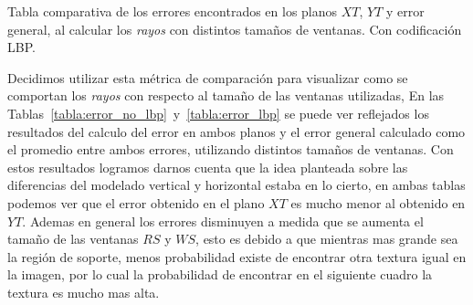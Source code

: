 \begin{table}[tb]
	\centering
	\caption{Tabla comparativa de los errores encontrados en los planos $XT$, $YT$ y error general, al calcular los \textit{rayos} con distintos tamaños de ventanas. Con codificación LBP.}
	\label{tabla:error_lbp}
\end{table}

Decidimos utilizar esta métrica de comparación para visualizar como se comportan los \textit{rayos} con respecto al tamaño de las ventanas utilizadas, En las Tablas~\ref{tabla:error_no_lbp}~y~\ref{tabla:error_lbp} se puede ver reflejados los resultados del calculo del error en ambos planos y el error general calculado como el promedio entre ambos errores, utilizando distintos tamaños de ventanas. Con estos resultados logramos darnos cuenta que la idea planteada sobre las diferencias del modelado vertical y horizontal estaba en lo cierto, en ambas tablas podemos ver que el error obtenido en el plano $XT$ es mucho menor al obtenido en $YT$. Ademas en general los errores disminuyen a medida que se aumenta el tamaño de las ventanas $RS$ y $WS$, esto es debido a que mientras mas grande sea la región de soporte, menos probabilidad existe de encontrar otra textura igual en la imagen, por lo cual la probabilidad de encontrar en el siguiente cuadro la textura es mucho mas alta.

